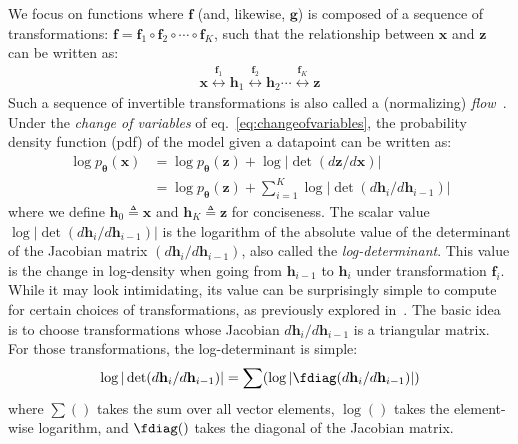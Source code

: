 \documentclass{article}
\newcommand{\bb}[1]{\mathbf{#1}}
\newcommand{\bx}{\bb{x}}
\newcommand{\bh}{\bb{h}}
\newcommand{\bz}{\bb{z}}
\newcommand{\bbf}{\bb{f}}
\newcommand{\bT}{\boldsymbol{\theta}}
\newcommand{\pT}{p_{\bT}}
\begin{document}
We focus on functions where $\bbf$ (and, likewise, $\mathbf{g}$) is composed of a sequence of transformations: $\bbf = \bbf_1 \circ \bbf_2 \circ \cdots \circ \bbf_K$, such that the relationship between $\bx$ and $\bz$ can be written as:
\begin{align}
\bx \overset{\bbf_1}{\longleftrightarrow} \bh_1 \overset{\bbf_2}{\longleftrightarrow} \bh_2 \cdots \overset{\bbf_K}{\longleftrightarrow} \bz
\end{align}
Such a sequence of invertible transformations is also called a (normalizing) \emph{flow}~\citep{rezende2015variational}. Under the \emph{change of variables} of eq.~\eqref{eq:changeofvariables}, the probability density function (pdf) of the model given a datapoint can be written as:
\begin{align}
\log \pT(\bx) &= \log \pT(\bz) + \log|\det(d\bz/d\bx)| \\
&= \log \pT(\bz) + \sum_{i=1}^{K} \log|\det(d\bh_i/d\bh_{i-1})|
\end{align}
where we define $\bh_0 \triangleq \bx$ and $\bh_K \triangleq \bz$ for conciseness.
The scalar value $\log|\det(d\bh_i/d\bh_{i-1})|$ is the logarithm of the absolute value of the determinant of the Jacobian matrix $(d\bh_i/d\bh_{i-1})$, also called the \emph{log-determinant}. This value is the change in log-density when going from $\bh_{i-1}$ to $\bh_{i}$ under transformation $\bbf_i$. While it may look intimidating, its value can be surprisingly simple to compute for certain choices of transformations, as previously explored in~\citep{deco1995higher,dinh2014nice,rezende2015variational,kingma2016improving}. The basic idea is to choose transformations whose Jacobian $d\bh_i/d\bh_{i-1}$ is a triangular matrix. For those transformations, the log-determinant is simple:
\begin{align}
 \log|\det(d\bh_i/d\bh_{i-1})| = \sum(\log | \fdiag(d\bh_i/d\bh_{i-1})| )
\end{align}
where $\sum()$ takes the sum over all vector elements, $\log()$ takes the element-wise logarithm, and $\fdiag()$ takes the diagonal of the Jacobian matrix.
\end{document}

